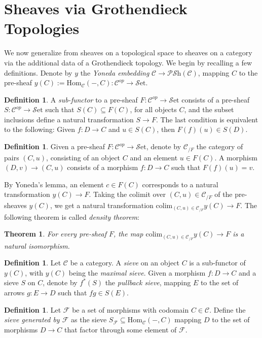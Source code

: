 \documentclass[10pt]{amsart}
\newcommand{\C}{\mathscr{C}}
\newcommand{\F}{\mathscr{F}}
\newcommand{\Hom}{\mathrm{Hom}}
\newcommand{\set}{\mathscr{S}\mathrm{et}}
\newcommand{\colim}{\mathrm{colim}}
\newcommand{\PSh}{\mathscr{P}\mathscr{S}\mathrm{h}}
\newtheorem{theorem}[equation]{Theorem}
\theoremstyle{definition}
\newtheorem{definition}[equation]{Definition}
\theoremstyle{remark}
\numberwithin{equation}{section}
\begin{document}
	\section{Sheaves via Grothendieck Topologies}
	
	We now generalize from sheaves on a topological space to sheaves on a category via the additional data of a Grothendieck topology. We begin by recalling a few definitions. Denote by $y$ the \textit{Yoneda embedding} $\C\to\PSh(\C)$, mapping $C$ to the pre-sheaf $y(C):=\Hom_\C(-,C)\colon\C^{op}\to\set$. 
	\begin{definition}
		A \emph{sub-functor} to a pre-sheaf $F\colon\C^{op}\to\set$ consists of a pre-sheaf $S:\C^{op}\to\set$ such that $S(C)\subseteq F(C)$, for all objects $C$, and the subset inclusions define a natural transformation $S\to F$. The last condition is equivalent to the following: Given $f\colon D\to C$ and $u\in S(C)$, then $F(f)(u)\in S(D)$. 
	\end{definition}
	\begin{definition}
		Given a pre-sheaf $F\colon\C^{op}\to\set$, denote by $\C_{/F}$ the category of pairs $(C,u)$, consisting of an object $C$ and an element $u\in F(C)$. A morphism $(D,v)\to(C,u)$ consists of a morphism $f\colon D\to C$ such that $F(f)(u)=v$. 
	\end{definition}By Yoneda's lemma, an element $c\in F(C)$ corresponds to a natural transformation $y(C)\rightarrow F$. Taking the colimit over $(C,u)\in\C_{/F}$ of the pre-sheaves $y(C)$, we get a natural transformation $\colim_{(C,u)\in\C_{/F}}y(C)\rightarrow F$. The following theorem is called \textit{density theorem}:
	\begin{theorem}\label{density}
		For every pre-sheaf $F$, the map $\colim_{(C,u)\in\C_{/F}}y(C)\rightarrow F$ is a natural isomorphism.
	\end{theorem}
	\begin{definition}
		Let $\C$ be a category. A \emph{sieve} on an object $C$ is a sub-functor of $y(C)$, with $y(C)$ being the \textit{maximal sieve}. Given a morphism $f\colon D\to C$ and a sieve $S$ on $C$, denote by $f^*(S)$ the \textit{pullback sieve}, mapping $E$ to the set of arrows $g\colon E\to D$ such that $fg\in S(E)$. 
	\end{definition}
	\begin{definition}\label{def:generatedsieve}
		Let ${\F}$ be a set of morphisms with codomain $C\in\C$. Define the \emph{sieve generated by $\F$} as the sieve $S_\F\subseteq\Hom_\C(-,C)$ mapping $D$ to the set of morphisms $D\to C$ that factor through some element of $\F$. 
	\end{definition}
\end{document}
